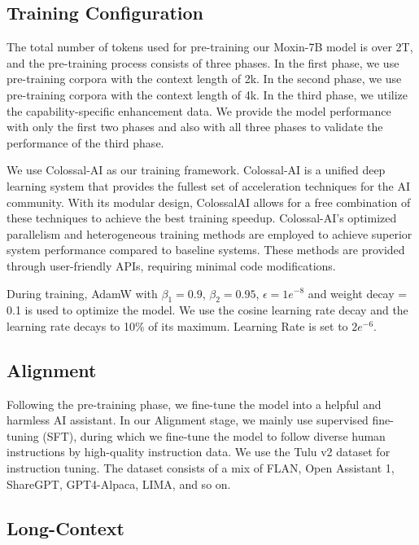 \subsection{Training Configuration}

The total number of tokens used for pre-training our Moxin-7B model is over 2T, and the pre-training process consists of three phases. In the first phase, we use pre-training corpora with the context length of 2k. In the second phase, we use pre-training corpora with the context length of 4k. In the third phase, we utilize the capability-specific enhancement data. We provide the model performance with only the first two phases and also with all three phases to validate the performance of the third phase. 

We use Colossal-AI \cite{li2023colossal} as our training framework. Colossal-AI is a unified deep learning system that provides the fullest set of acceleration techniques for the AI community. With its modular design, ColossalAI allows for a free combination of these techniques to achieve the best training speedup. Colossal-AI's optimized parallelism and heterogeneous training methods are employed to achieve superior system performance compared to baseline systems. These methods are provided through user-friendly APIs, requiring minimal code modifications.

  
During training, AdamW \cite{loshchilov2017decoupled} with $\beta_1 = 0.9$, $\beta_2 = 0.95$, $\epsilon = 1e^{-8}$ and weight decay = 0.1 is used to optimize the model. We use the cosine learning rate decay and the learning rate decays to 10\% of its maximum.  Learning Rate is set to $2e^{-6}$. 

\subsection{Alignment}


Following the pre-training phase, we fine-tune the model into a helpful and harmless AI assistant.
In our Alignment stage, we mainly use supervised fine-tuning (SFT), during which we fine-tune the model to follow diverse human instructions by high-quality instruction data. We use the Tulu v2 dataset \cite{ivison2023camels} for instruction tuning. The dataset consists of a mix of FLAN, Open Assistant 1, ShareGPT, GPT4-Alpaca, LIMA, and so on. 

\subsection{Long-Context}\label{sec3.4}

